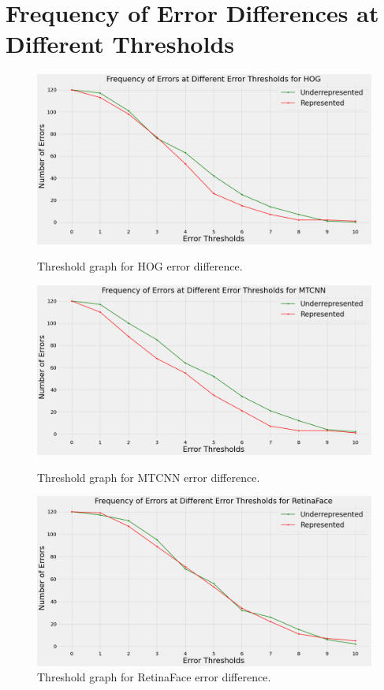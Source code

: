 \documentclass{l4proj}
\begin{document}
\section{Frequency of Error Differences at Different Thresholds}
\label{erroratthresholds}
\begin{figure}[h!]
  \centering
  \begin{minipage}{0.49\textwidth}
    \includegraphics[width=\textwidth]{images/dlib_threshold.png}
    \caption{Threshold graph for HOG error difference.}
    \label{dlib_threshold}
  \end{minipage}
  \hfill
  \begin{minipage}{0.49\textwidth}
    \includegraphics[width=\textwidth]{images/mtcnn_threshold.png}
    \caption{Threshold graph for MTCNN error difference.}
    \label{mtcnn_threshold}
  \end{minipage}
  \hfill
  \begin{minipage}{0.49\textwidth}
    \includegraphics[width=\textwidth]{images/retinaface_threshold.png}
    \caption{Threshold graph for RetinaFace error difference.}
    \label{retinaface_threshold}
  \end{minipage}  
  

\end{figure}
\end{document}
